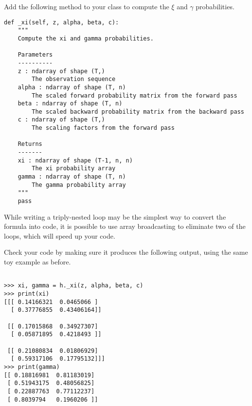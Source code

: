 \begin{problem}
Add the following method to your class to compute the $\xi$ and $\gamma$ probabilities.
\begin{lstlisting}
def _xi(self, z, alpha, beta, c):
    """
    Compute the xi and gamma probabilities.

    Parameters
    ----------
    z : ndarray of shape (T,)
        The observation sequence
    alpha : ndarray of shape (T, n)
        The scaled forward probability matrix from the forward pass
    beta : ndarray of shape (T, n)
        The scaled backward probability matrix from the backward pass
    c : ndarray of shape (T,)
        The scaling factors from the forward pass

    Returns
    -------
    xi : ndarray of shape (T-1, n, n)
        The xi probability array
    gamma : ndarray of shape (T, n)
        The gamma probability array
    """
    pass
\end{lstlisting}
While writing a triply-nested loop may be the simplest way to convert the formula into code,
it is possible to use array broadcasting to eliminate two of the loops, which will speed up your code.

Check your code by making sure it produces the following output, using the same toy example as before.
\begin{lstlisting}

>>> xi, gamma = h._xi(z, alpha, beta, c)
>>> print(xi)
[[[ 0.14166321  0.0465066 ]
  [ 0.37776855  0.43406164]]

 [[ 0.17015868  0.34927307]
  [ 0.05871895  0.4218493 ]]

 [[ 0.21080834  0.01806929]
  [ 0.59317106  0.17795132]]]
>>> print(gamma)
[[ 0.18816981  0.81183019]
 [ 0.51943175  0.48056825]
 [ 0.22887763  0.77112237]
 [ 0.8039794   0.1960206 ]]
\end{lstlisting}
\end{problem}

